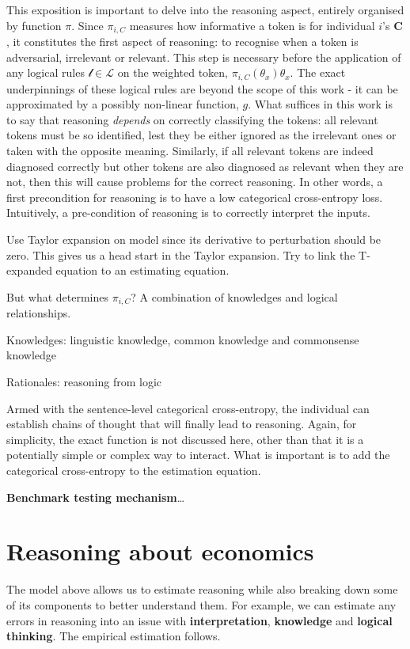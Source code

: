 \documentclass[
]{article}
\begin{document}
This exposition is important to delve into the reasoning aspect,
entirely organised by function \(\pi\). Since \(\pi_{i, C}\) measures
how informative a token is for individual \(i\)'s \(\mathbf{C}\), it
constitutes the first aspect of reasoning: to recognise when a token is
adversarial, irrelevant or relevant. This step is necessary before the
application of any logical rules \(\mathcal{l} \in \mathcal{L}\) on the
weighted token, \(\pi_{i, C}(\theta_x) \theta_x\). The exact
underpinnings of these logical rules are beyond the scope of this work -
it can be approximated by a possibly non-linear function, \(g\). What
suffices in this work is to say that reasoning \emph{depends} on
correctly classifying the tokens: all relevant tokens must be so
identified, lest they be either ignored as the irrelevant ones or taken
with the opposite meaning. Similarly, if all relevant tokens are indeed
diagnosed correctly but other tokens are also diagnosed as relevant when
they are not, then this will cause problems for the correct reasoning.
In other words, a first precondition for reasoning is to have a low
categorical cross-entropy loss. Intuitively, a pre-condition of
reasoning is to correctly interpret the inputs.

Use Taylor expansion on model since its derivative to perturbation
should be zero. This gives us a head start in the Taylor expansion. Try
to link the T-expanded equation to an estimating equation.

But what determines \(\pi_{i, C}\)? A combination of knowledges and
logical relationships.

Knowledges: linguistic knowledge, common knowledge and commonsense
knowledge

Rationales: reasoning from logic

Armed with the sentence-level categorical cross-entropy, the individual
can establish chains of thought that will finally lead to reasoning.
Again, for simplicity, the exact function is not discussed here, other
than that it is a potentially simple or complex way to interact. What is
important is to add the categorical cross-entropy to the estimation
equation.

\textbf{Benchmark testing mechanism}\ldots{}

\section{Reasoning about economics}\label{reasoning-about-economics}

The model above allows us to estimate reasoning while also breaking down
some of its components to better understand them. For example, we can
estimate any errors in reasoning into an issue with
\textbf{interpretation}, \textbf{knowledge} and \textbf{logical
thinking}. The empirical estimation follows.
\end{document}

